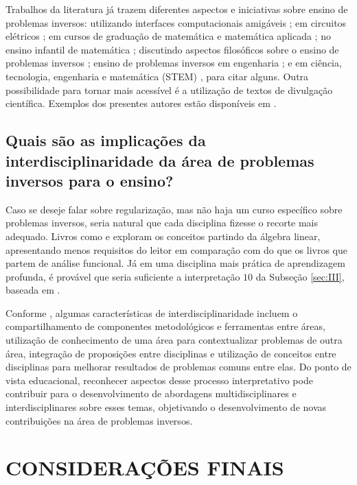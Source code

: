 Trabalhos da literatura já trazem diferentes aspectos e iniciativas sobre ensino de problemas inversos: utilizando interfaces computacionais amigáveis \cite{Crosta1990}; em circuitos elétricos \cite{Curtis2000, Curtis2007}; em cursos de graduação de matemática e matemática aplicada \cite{Liu2003}; no ensino infantil de matemática \cite{Ding2017}; discutindo aspectos filosóficos sobre o ensino de problemas inversos \cite{Kornilov2018}; ensino de problemas inversos em engenharia \cite{Putnik2022}; e em ciência, tecnologia, engenharia e matemática (STEM) \cite{Martinez-Luaces2022}, para citar alguns. Outra possibilidade para tornar mais acessível é a utilização de textos de divulgação científica. Exemplos dos presentes autores estão disponíveis em \cite{ufabcDC5, ufabcDC4, ufabcDC1, ufabcDC2, ufabcDC3, ufabcDC6}. 


\subsection{Quais são as implicações da interdisciplinaridade da área de problemas inversos para o ensino?}


Caso se deseje falar sobre regularização, mas não haja um curso específico sobre problemas inversos, seria natural que cada disciplina fizesse o recorte mais adequado. Livros como \cite{aster2019parameter} e \cite{hansen2010discrete} exploram os conceitos partindo da álgebra linear, apresentando menos requisitos do leitor em comparação com do que os livros que partem de análise funcional. Já em uma disciplina mais prática de aprendizagem profunda, é provável que seria suficiente a interpretação $10$ da Subseção \eqref{sec:III}, baseada em \cite{goodfellow2016deep}. 

Conforme \cite{Klein2017}, algumas características de interdisciplinaridade incluem o compartilhamento de componentes metodológicos e ferramentas entre áreas, utilização de conhecimento de uma área para contextualizar problemas de outra área, integração de proposições entre disciplinas e utilização de conceitos entre disciplinas para melhorar resultados de problemas comuns entre elas. Do ponto de vista educacional, reconhecer aspectos desse processo interpretativo pode contribuir para o desenvolvimento de abordagens multidisciplinares e interdisciplinares sobre esses temas, objetivando o desenvolvimento de novas contribuições na área de problemas inversos.




\newpage
\section{CONSIDERAÇÕES FINAIS}\label{sec:conclusion}

